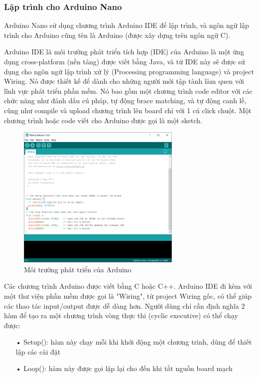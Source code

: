 \subsubsection*{Lập trình cho Arduino Nano}
Arduino Nano sử dụng chương trình Arduino IDE để lập trình, và ngôn ngữ lập trình cho Arduino cũng tên là Arduino (được xây dựng trên ngôn ngữ C). 

Arduino IDE là môi trường phát triển tích hợp (IDE) của Arduino là một ứng dụng cross-platform (nền tảng) được viết bằng Java, và từ IDE này sẽ được sử dụng cho ngôn ngữ lập trình xử lý (Processing programming language) và project Wiring. Nó được thiết kế để dành cho những người mới tập tành làm quen với lĩnh vực phát triển phần mềm. Nó bao gồm một chương trình code editor với các chức năng như đánh dấu cú pháp, tự động brace matching, và tự động canh lề, cũng như compile và upload chương trình lên board chỉ với 1 cú click chuột. Một chương trình hoặc code viết cho Arduino được gọi là một sketch.

\begin{figure}[H]
\centering    
\includegraphics[width=0.7\textwidth]{arduinonano_ide}
\caption[Môi trường phát triển của Arduino]{Môi trường phát triển của Arduino}
\label{fig:arduinonano_ide}
\end{figure}

Các chương trình Arduino được viết bằng C hoặc C++. Arduino IDE đi kèm với một thư viện phần mềm được gọi là "Wiring", từ project Wiring gốc, có thể giúp các thao tác input/output được dễ dàng hơn. Người dùng chỉ cần định nghĩa 2 hàm để tạo ra một chương trình vòng thực thi (cyclic executive) có thể chạy được:
\begin{itemize}
\item[•]Setup(): hàm này chạy mỗi khi khởi động một chương trình, dùng để thiết lập
các cài đặt
\item[•]Loop(): hàm này được gọi lặp lại cho đến khi tắt nguồn board mạch
\end{itemize}

